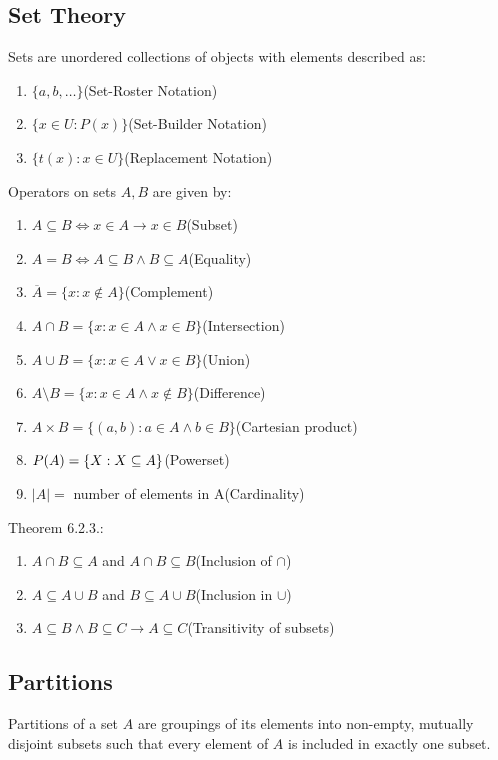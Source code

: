 \documentclass[12pt, a4paper]{article}
\begin{document}
\begin{multicols*}{3}
\colbreak
\section{Set Theory}
Sets are unordered collections of objects with elements described as:
\begin{enumerate}[\roman*.]
  \item $\{a, b, \ldots\}$\hfill(Set-Roster Notation)
  \item $\{x \in U : P(x)\}$\hfill(Set-Builder Notation)
  \item $\{t(x) : x \in U\}$\hfill(Replacement Notation)
\end{enumerate}

Operators on sets $A, B$ are given by:
\begin{enumerate}[\roman*.]
  \item $A \subseteq B \iff x \in A \rightarrow x \in B$\hfill(Subset) 
  \item $A = B \iff A \subseteq B \land B \subseteq A$\hfill(Equality)
  \item $\overline{A} = \{x: x\not\in A\}$\hfill(Complement)
  \item $A \cap B = \{x : x \in A \land x \in B\}$\hfill(Intersection)
  \item $A \cup B = \{x : x \in A \lor x \in B\}$\hfill(Union)
  \item $A \setminus B = \{x : x \in A \land x \not\in B\}$\hfill(Difference)
  \item $A \times B = \{(a, b) : a \in A \land b \in B\}$\hfill(Cartesian product)
  \item $\powerset(A) = \{X : X \subseteq A\}$\hfill(Powerset)
  \item $|A| =$ number of elements in A\hfill(Cardinality)
\end{enumerate}

Theorem 6.2.3.:
\begin{enumerate}[\roman*.]
  \item $A\cap B \subseteq A$ and $A \cap B \subseteq B$\hfill(Inclusion of $\cap$)
  \item $A \subseteq A \cup B$ and $B \subseteq A \cup B$\hfill(Inclusion in $\cup$)
  \item $A \subseteq B \land B \subseteq C \rightarrow A \subseteq C$\hfill(Transitivity of subsets)
\end{enumerate}

\subsection{Partitions}
Partitions of a set $A$ are groupings of its elements into non-empty, mutually disjoint subsets such that every element of $A$ is included in exactly one subset.


\end{multicols*}
\end{document}
